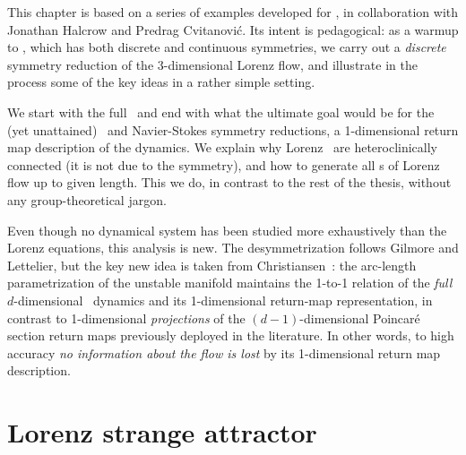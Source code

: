 
 
This chapter is based on a series of examples developed for
\wwwcb{}, in collaboration with Jonathan Halcrow and
Predrag Cvitanovi\'c. Its intent is pedagogical: as a warmup to
\KSe, which has both discrete and continuous
symmetries, we carry out a {\em discrete} symmetry reduction of
the 3-dimensional Lorenz flow, and illustrate in the process
some of the key ideas in a rather simple setting.

We start with the full \statesp\ and end with what the ultimate
goal would be for the (yet unattained) \KS\ and Navier-Stokes
symmetry reductions, a 1-dimensional return map description of
the dynamics. We explain why Lorenz \eqva\ are heteroclinically
connected (it is not due to the symmetry), and how to generate
all \po s of Lorenz flow up to given length. This we do, in
contrast to the rest of the thesis, without any
group-theoretical jargon. 

Even though no dynamical system has been studied more
exhaustively than the Lorenz equations, this analysis is new.
The desymmetrization follows Gilmore and
Lettelier, but the key new idea is taken from
Christiansen~\etal{}: the arc-length
parametrization of the unstable manifold maintains the 1-to-1
relation of the {\em full} $d$-dimensional \statesp\ dynamics
and its 1-dimensional return-map representation, in contrast to
1-dimensional {\em projections} of the $(d\!-\!1)$-dimensional
Poincar\'e section return maps previously deployed in the
literature. In other words, to high accuracy {\em no information
about the flow is lost} by its 1-dimensional return map description.
 

\section{Lorenz strange attractor}\label{exmp:Lorenz}

